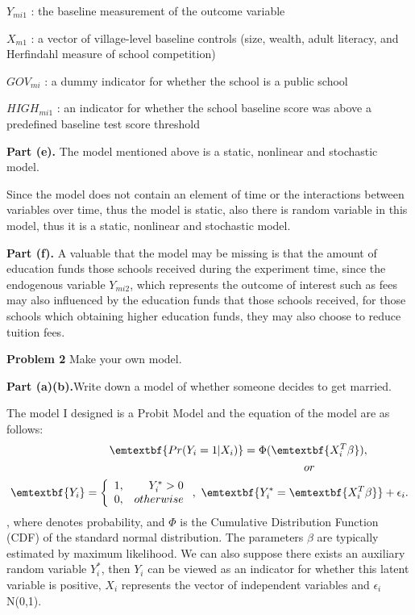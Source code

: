 \documentclass[letterpaper,12pt]{article}
\theoremstyle{definition}
\begin{document}
\noindent $Y_{mi1}$ : the baseline measurement of the outcome variable

\noindent $X_{m1}$ : a vector of village-level baseline controls (size, wealth, adult literacy, and Herfindahl measure of school competition)

\noindent $GOV_{mi}$ : a dummy indicator for whether the school is a public school

\noindent $HIGH_{mi1}$ : an indicator for whether the school baseline score was above a predefined baseline test score threshold

\noindent\textbf{Part (e).} The model mentioned above is a static, nonlinear and stochastic model.

\noindent Since the model does not contain an element of time or the interactions between variables over time, thus the model is static, also there is random variable in this model, thus it is a static, nonlinear and stochastic model.

\noindent\textbf{Part (f).} A valuable that the model may be missing is that the amount of education funds those schools received during the experiment time, since the endogenous variable $Y_{mi2}$, which represents the outcome of interest such as fees may also influenced by the education funds that those schools received, for those schools which obtaining higher education funds, they may also choose to reduce tuition fees. 

\newpage

\noindent\textbf{Problem 2}
Make your own model.

\noindent\textbf{Part (a)(b).}Write down a model of whether someone decides to get married.

\noindent The model I designed is a Probit Model and the equation of the model are as follows:
\begin{equation*}
\begin{split}
 \emtextbf{Pr(Y_{i} = 1 | X_{i})} = \Phi(\emtextbf{X_{i}^T\beta}),~~~~~~~~~~~ \\or~~~~~~~~~~~~~~~~~~~~~~~~~ \\
 \emtextbf{Y_{i}} = \left\{
                        \begin{array}{lr}
                        1, & Y_{i}^* > 0 \\
                        0, & otherwise
                        \end{array}
                \right.,~\emtextbf{Y_{i}^* = \emtextbf{X_{i}^T\beta}} + \epsilon_{i}. \\
\end{split}
\end{equation*}
\noindent , where  denotes probability, and $\Phi$ is the Cumulative Distribution Function (CDF) of the standard normal distribution. The parameters $\beta$ are typically estimated by maximum likelihood. We can also suppose there exists an auxiliary random variable $Y_{i}^*$, then $Y_{i}$ can be viewed as an indicator for whether this latent variable is positive,  $X_{i}$ represents the vector of independent variables and $\epsilon_{i}$ \thicksim N(0,1).
\end{document}
